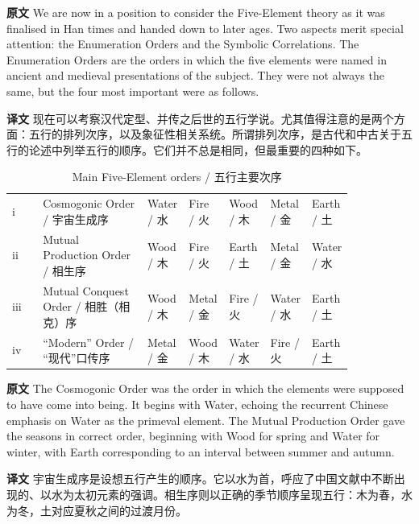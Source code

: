 \documentclass[UTF8,zihao=-4]{ctexart}
\newcommand{\BodyFont}{\fontsize{10.5pt}{15.5pt}\selectfont}
\newcommand{\origlabel}{\textbf{原文}\quad}
\newcommand{\translabel}{\textbf{译文}\quad}
\newenvironment{enblock}{\par\noindent\begingroup\BodyFont\origlabel}{\par\endgroup}
\newenvironment{zhblock}{\par\noindent\begingroup\BodyFont\translabel}{\par\endgroup\vspace{0.35em}}
\begin{document}
\begin{enblock}
We are now in a position to consider the Five-Element theory as it was finalised in Han times and handed down to later ages. Two aspects merit special attention: the Enumeration Orders and the Symbolic Correlations. The Enumeration Orders are the orders in which the five elements were named in ancient and medieval presentations of the subject. They were not always the same, but the four most important were as follows.
\end{enblock}
\begin{zhblock}
现在可以考察汉代定型、并传之后世的五行学说。尤其值得注意的是两个方面：五行的排列次序，以及象征性相关系统。所谓排列次序，是古代和中古关于五行的论述中列举五行的顺序。它们并不总是相同，但最重要的四种如下。
\end{zhblock}

\begin{longtable}{>{\raggedright\arraybackslash}p{0.1\linewidth}
                  >{\raggedright\arraybackslash}p{0.34\linewidth}
                  >{\centering\arraybackslash}p{0.08\linewidth}
                  >{\centering\arraybackslash}p{0.08\linewidth}
                  >{\centering\arraybackslash}p{0.08\linewidth}
                  >{\centering\arraybackslash}p{0.08\linewidth}
                  >{\centering\arraybackslash}p{0.08\linewidth}}
\caption{Main Five-Element orders / 五行主要次序}\\
\toprule
i & Cosmogonic Order / 宇宙生成序 & Water / 水 & Fire / 火 & Wood / 木 & Metal / 金 & Earth / 土\\
ii & Mutual Production Order / 相生序 & Wood / 木 & Fire / 火 & Earth / 土 & Metal / 金 & Water / 水\\
iii & Mutual Conquest Order / 相胜（相克）序 & Wood / 木 & Metal / 金 & Fire / 火 & Water / 水 & Earth / 土\\
iv & ``Modern'' Order / “现代”口传序 & Metal / 金 & Wood / 木 & Water / 水 & Fire / 火 & Earth / 土\\
\bottomrule
\end{longtable}

\begin{enblock}
The Cosmogonic Order was the order in which the elements were supposed to have come into being. It begins with Water, echoing the recurrent Chinese emphasis on Water as the primeval element. The Mutual Production Order gave the seasons in correct order, beginning with Wood for spring and Water for winter, with Earth corresponding to an interval between summer and autumn.
\end{enblock}
\begin{zhblock}
宇宙生成序是设想五行产生的顺序。它以水为首，呼应了中国文献中不断出现的、以水为太初元素的强调。相生序则以正确的季节顺序呈现五行：木为春，水为冬，土对应夏秋之间的过渡月份。
\end{zhblock}
\end{document}
